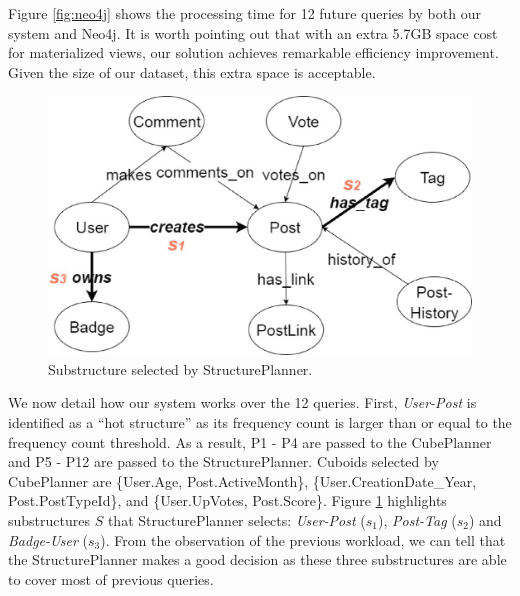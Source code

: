 Figure \ref{fig:neo4j} shows the processing time for 12 future queries by both our system and Neo4j. It is worth pointing out that with an extra 5.7GB space cost for materialized views, our solution achieves remarkable efficiency improvement. Given the size of our dataset, this extra space is acceptable.

\begin{figure}[H]
	\centering
	\includegraphics[scale=0.5]{pic/MetaSExp.eps}
	\caption{Substructure selected by StructurePlanner.}
	\label{fig:metagraphexperimenthot}
\end{figure}

We now detail how our system works over the 12 queries. First, \textit{User-Post} is identified as a ``hot structure'' as its frequency count is larger than or equal to the frequency count threshold. As a result, P1 - P4 are passed to the CubePlanner and P5 - P12 are passed to the StructurePlanner. Cuboids selected by CubePlanner are \{User.Age, Post.ActiveMonth\}, \{User.CreationDate\_Year, Post.PostTypeId\}, and \{User.UpVotes, Post.Score\}. Figure \ref{fig:metagraphexperimenthot} highlights substructures $S$ that StructurePlanner selects:  \textit{User-Post} ($s_1$), \textit{Post-Tag} ($s_2$) and \textit{Badge-User} ($s_3$). From the observation of the previous workload, we can tell that the StructurePlanner makes a good decision as these three substructures are able to cover most of previous queries.


